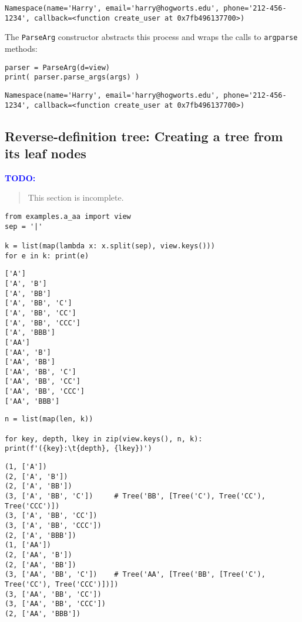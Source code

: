 \documentclass[10pt]{amsart}
\numberwithin{equation}{section}
\begin{document}
\begin{verbatim}
Namespace(name='Harry', email='harry@hogworts.edu', phone='212-456-1234', callback=<function create_user at 0x7fb496137700>)
\end{verbatim}


The \texttt{ParseArg} constructor abstracts this process and wraps the calls 
to \texttt{argparse} methods:
\begin{verbatim}
parser = ParseArg(d=view)
print( parser.parse_args(args) )
\end{verbatim}

\begin{verbatim}
Namespace(name='Harry', email='harry@hogworts.edu', phone='212-456-1234', callback=<function create_user at 0x7fb496137700>)
\end{verbatim}

\subsection{Reverse-definition tree: Creating a tree from its leaf nodes}
\label{sec:orge4f64aa}
\mbox{}

\textcolor{blue}{\bf TODO:}
\begin{quote}
This section is incomplete. 
\end{quote}

\begin{verbatim}
from examples.a_aa import view
sep = '|'

k = list(map(lambda x: x.split(sep), view.keys())) 
for e in k: print(e)
\end{verbatim}

\begin{verbatim}
['A']
['A', 'B']
['A', 'BB']
['A', 'BB', 'C']
['A', 'BB', 'CC']
['A', 'BB', 'CCC']
['A', 'BBB']
['AA']
['AA', 'B']
['AA', 'BB']
['AA', 'BB', 'C']
['AA', 'BB', 'CC']
['AA', 'BB', 'CCC']
['AA', 'BBB']
\end{verbatim}


\begin{verbatim}
n = list(map(len, k))

for key, depth, lkey in zip(view.keys(), n, k): print(f'({key}:\t{depth}, {lkey})')
\end{verbatim}

\begin{verbatim}
(1, ['A'])
(2, ['A', 'B'])
(2, ['A', 'BB'])
(3, ['A', 'BB', 'C'])     # Tree('BB', [Tree('C'), Tree('CC'), Tree('CCC')])
(3, ['A', 'BB', 'CC'])
(3, ['A', 'BB', 'CCC'])
(2, ['A', 'BBB'])
(1, ['AA'])
(2, ['AA', 'B'])
(2, ['AA', 'BB'])
(3, ['AA', 'BB', 'C'])    # Tree('AA', [Tree('BB', [Tree('C'), Tree('CC'), Tree('CCC')])])
(3, ['AA', 'BB', 'CC'])
(3, ['AA', 'BB', 'CCC'])
(2, ['AA', 'BBB'])


\end{verbatim}
\end{document}
